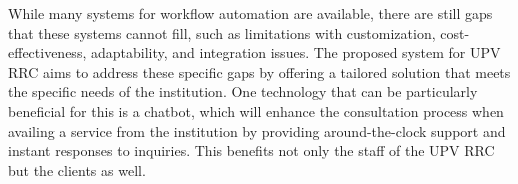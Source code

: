 While many systems for workflow automation are available, there are still gaps that these systems cannot fill, such as limitations with customization, cost-effectiveness, adaptability, and integration issues. The proposed system for UPV RRC aims to address these specific gaps by offering a tailored solution that meets the specific needs of the institution. One technology that can be particularly beneficial for this is a chatbot, which will enhance the consultation process when availing a service from the institution by providing around-the-clock support and instant responses to inquiries. This benefits not only the staff of the UPV RRC but the clients as well.












